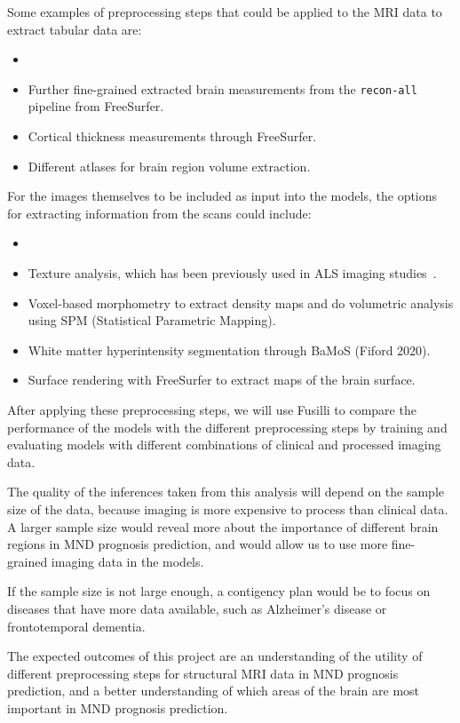 Some examples of preprocessing steps that could be applied to the MRI data to extract tabular data are:
\begin{itemize}
\item \setlength\itemsep{-0.5em}
    \item Further fine-grained extracted brain measurements from the \texttt{recon-all} pipeline from FreeSurfer.
    \item Cortical thickness measurements through FreeSurfer.
    \item Different atlases for brain region volume extraction.
\end{itemize}

For the images themselves to be included as input into the models, the options for extracting information from the scans could include:
\begin{itemize}
\item \setlength\itemsep{-0.5em}
    \item Texture analysis, which has been previously used in ALS imaging studies~\cite{ishaqueEvaluatingCerebralCorrelates2018, johnsQuantifyingChangesSusceptibility2019}.
    \item Voxel-based morphometry to extract density maps and do volumetric analysis using SPM (Statistical Parametric Mapping).
    \item White matter hyperintensity segmentation through BaMoS (Fiford 2020).
    \item Surface rendering with FreeSurfer to extract maps of the brain surface.
\end{itemize}

After applying these preprocessing steps, we will use Fusilli to compare the performance of the models with the different preprocessing steps by training and evaluating models with different combinations of clinical and processed imaging data.

The quality of the inferences taken from this analysis will depend on the sample size of the data, because imaging is more expensive to process than clinical data.
A larger sample size would reveal more about the importance of different brain regions in MND prognosis prediction, and would allow us to use more fine-grained imaging data in the models.

If the sample size is not large enough, a contigency plan would be to focus on diseases that have more data available, such as Alzheimer's disease or frontotemporal dementia.

The expected outcomes of this project are an understanding of the utility of different preprocessing steps for structural MRI data in MND prognosis prediction, and a better understanding of which areas of the brain are most important in MND prognosis prediction.


